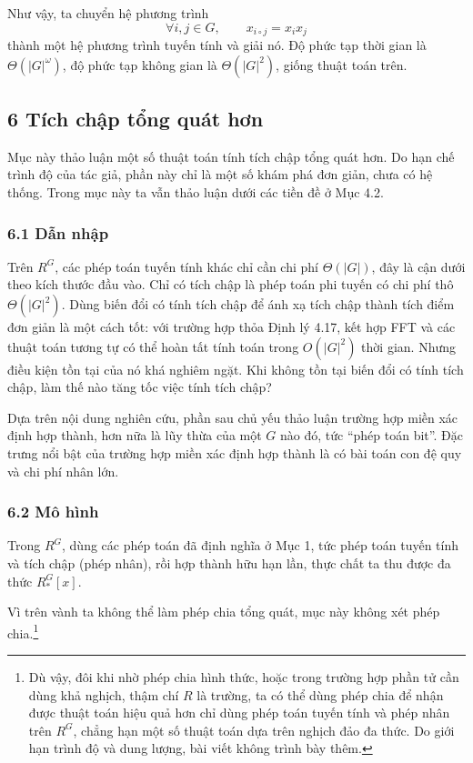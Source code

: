 \documentclass[11pt]{article}
\begin{document}
Như vậy, ta chuyển hệ phương trình
\[
  \forall i,j\in G,\qquad x_{i\circ j}=x_ix_j
\]
thành một hệ phương trình tuyến tính và giải nó. Độ phức tạp thời gian là
\(\Theta(|G|^\omega)\), độ phức tạp không gian là \(\Theta(|G|^2)\), giống thuật
toán trên.

\subsection*{6 Tích chập tổng quát hơn}

Mục này thảo luận một số thuật toán tính tích chập tổng quát hơn. Do hạn chế
trình độ của tác giả, phần này chỉ là một số khám phá đơn giản, chưa có hệ
thống. Trong mục này ta vẫn thảo luận dưới các tiền đề ở Mục 4.2.

\subsubsection*{6.1 Dẫn nhập}

Trên \(R^G\), các phép toán tuyến tính khác chỉ cần chi phí \(\Theta(|G|)\), đây
là cận dưới theo kích thước đầu vào. Chỉ có tích chập là phép toán phi tuyến có
chi phí thô \(\Theta(|G|^2)\). Dùng biến đổi có tính tích chập để ánh xạ tích
chập thành tích điểm đơn giản là một cách tốt: với trường hợp thỏa Định lý 4.17,
kết hợp FFT và các thuật toán tương tự có thể hoàn tất tính toán trong
\(O(|G|^2)\) thời gian. Nhưng điều kiện tồn tại của nó khá nghiêm ngặt. Khi
không tồn tại biến đổi có tính tích chập, làm thế nào tăng tốc việc tính tích
chập?

Dựa trên nội dung nghiên cứu, phần sau chủ yếu thảo luận trường hợp miền xác
định hợp thành, hơn nữa là lũy thừa của một \(G\) nào đó, tức ``phép toán
bit''. Đặc trưng nổi bật của trường hợp miền xác định hợp thành là có bài toán
con đệ quy và chi phí nhân lớn.

\subsubsection*{6.2 Mô hình}

Trong \(R^G\), dùng các phép toán đã định nghĩa ở Mục 1, tức phép toán tuyến
tính và tích chập (phép nhân), rồi hợp thành hữu hạn lần, thực chất ta thu được
đa thức \(R^G_*[x]\).

Vì trên vành ta không thể làm phép chia tổng quát, mục này không xét phép
chia.\footnote{Dù vậy, đôi khi nhờ phép chia hình thức, hoặc trong trường hợp
phần tử cần dùng khả nghịch, thậm chí \(R\) là trường, ta có thể dùng phép chia
để nhận được thuật toán hiệu quả hơn chỉ dùng phép toán tuyến tính và phép nhân
trên \(R^G\), chẳng hạn một số thuật toán dựa trên nghịch đảo đa thức. Do giới
hạn trình độ và dung lượng, bài viết không trình bày thêm.}
\end{document}
